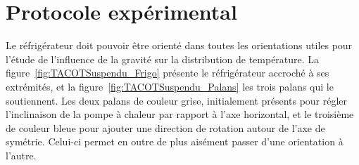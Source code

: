 \section{Protocole expérimental}\label{chap:ProtocolExpe}
Le réfrigérateur doit pouvoir être orienté dans toutes les orientations utiles pour l'étude de l'influence de la gravité sur la distribution de température. La figure~\ref{fig:TACOTSuspendu_Frigo} présente le réfrigérateur accroché à ses extrémités, et la figure~\ref{fig:TACOTSuspendu_Palans} les trois palans qui le soutiennent. Les deux palans de couleur grise, initialement présents pour régler l'inclinaison de la pompe à chaleur par rapport à l'axe horizontal, et le troisième de couleur bleue pour ajouter une direction de rotation autour de l'axe de symétrie. Celui-ci permet en outre de plus aisément passer d'une orientation à l'autre. 

